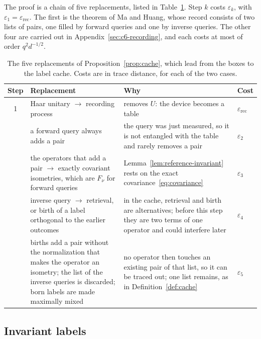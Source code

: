 \documentclass[11pt,letterpaper]{article}
\theoremstyle{definition}\newtheorem{definition}[theorem]{Definition}
\begin{document}
The proof is a chain of five replacements, listed in
Table~\ref{tab:hybrids}. Step $k$ costs
$\varepsilon_k$, with $\varepsilon_1=\varepsilon_{\mathrm{rec}}$.
The first is the theorem of Ma and Huang,
whose record consists of two lists of pairs, one filled by forward
queries and one by inverse queries. The other four are carried out in
Appendix~\ref{sec:c6-recording}, and each costs at most of order
$q^2d^{-1/2}$.

\begin{table}[ht]
\centering
\small
\begin{tabular}{@{}c>{\raggedright\arraybackslash}p{6.3cm}>{\raggedright\arraybackslash}p{6.9cm}l@{}}
\toprule
Step & Replacement & Why & Cost\\
\midrule
1 & Haar unitary $\to$ recording process~\cite{mahuang2025}
  & removes $U$: the device becomes a table
  & $\varepsilon_{\mathrm{rec}}$\\\addlinespace
2 & a forward query always adds a pair
  & the query was just measured, so it is not entangled with the table and rarely removes a pair
  & $\varepsilon_2$\\\addlinespace
3 & the operators that add a pair $\to$ exactly covariant isometries, which are $F_\nu$ for forward queries
    & Lemma~\ref{lem:reference-invariant} rests on the exact covariance~\eqref{eq:covariance}
  & $\varepsilon_3$\\\addlinespace
4 & inverse query $\to$ retrieval, or birth of a label orthogonal to the earlier outcomes
    & in the cache, retrieval and birth are alternatives; before this step they are two terms of one operator and could interfere later
  & $\varepsilon_4$\\\addlinespace
5 & births add a pair without the normalization that makes the operator an isometry; the list of the inverse queries is discarded; born labels are made maximally mixed
  & no operator then touches an existing pair of that list, so it can be traced out; one list remains, as in Definition~\ref{def:cache}
  & $\varepsilon_5$\\
\bottomrule
\end{tabular}
\caption{The five replacements of Proposition~\ref{prop:cache}, which
lead from the boxes to the label cache. Costs are in trace distance, for
each of the two cases.}
\label{tab:hybrids}
\end{table}

\subsection{Invariant labels}\label{sec:invariant}\label{rem:crossover}
\end{document}
